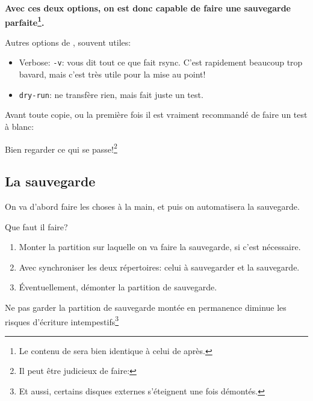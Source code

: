   \textbf{Avec ces deux options, on est donc capable de faire une
    sauvegarde parfaite\footnote{Le contenu de  sera
      bien identique à celui de  après.}.}
  
  Autres options de , souvent utiles:

  \begin{itemize}
    \item Verbose: \texttt{-v}: vous dit tout ce que fait rsync. C'est
      rapidement beaucoup trop bavard, mais c'est très utile pour la
      mise au point!

    \item \texttt{\tirr dry-run}: ne transfère rien, mais fait juste un
      test.
  \end{itemize}

  Avant toute copie, ou la première fois il est \large{vraiment}
  recommandé de faire un test à blanc:


  Bien regarder ce qui se passe!\footnote{Il peut être judicieux de
    faire: }
    
\subsection{La sauvegarde} On va d'abord faire les choses \og à la
main\fg{}, et puis on automatisera la sauvegarde.

Que faut il faire?

\begin{enumerate}
  \item Monter la partition sur laquelle on va faire la sauvegarde, si
    c'est nécessaire.
  \item Avec  synchroniser les deux répertoires: celui à
    sauvegarder et la sauvegarde.
  \item Éventuellement, démonter la partition de sauvegarde.
\end{enumerate}

Ne pas garder la partition de sauvegarde montée en permanence diminue
les risques d'écriture intempestifs\footnote{Et aussi, certains
  disques externes s'éteignent une fois démontés.}

